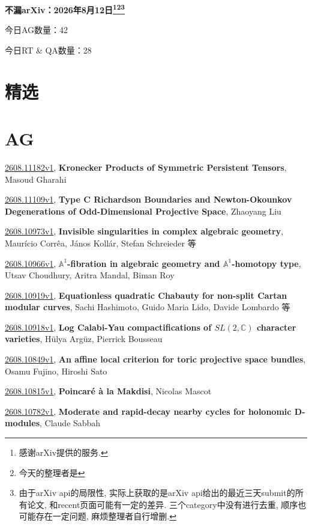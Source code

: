 \documentclass[9pt, a4paper]{article}
\theoremstyle{plain}
\theoremstyle{definition}
\theoremstyle{remark}
\newcommand{\arxiv}[3]{\href{https://arxiv.org/abs/#1}{#1}, \textbf{\textcolor{arxivblue}{#2}}, #3}
\newcommand{\AGnumber}{42}
\newcommand{\RTQAnumber}{28}
\newcommand{\NewestDate}{2026年8月12日}
\newcommand{\todayarXiver}{} %
\begin{document}
\begin{center}
    \Huge\textbf{不漏arXiv：\NewestDate\footnote{感谢arXiv提供的服务.}\footnote{今天的整理者是\todayarXiver}\footnote{由于arXiv api的局限性, 实际上获取的是arXiv api给出的最近三天submit的所有论文, 和recent页面可能有一定的差异. 三个category中没有进行去重, 顺序也可能存在一定问题, 麻烦整理者自行增删.}} \\
\end{center}

\setcounter{section}{-1}

\begin{center}
    今日AG数量：\AGnumber
    
    今日RT \& QA数量：\RTQAnumber
    
\end{center}


\section{精选}


\section{AG}
\arxiv{2608.11182v1}{Kronecker Products of Symmetric Persistent Tensors}{Masoud Gharahi}

\arxiv{2608.11109v1}{Type C Richardson Boundaries and Newton-Okounkov Degenerations of Odd-Dimensional Projective Space}{Zhaoyang Liu}

\arxiv{2608.10973v1}{Invisible singularities in complex algebraic geometry}{Maurício Corrêa, János Kollár, Stefan Schreieder 等}

\arxiv{2608.10966v1}{$\mathbb{A}^1$-fibration in algebraic geometry and $\mathbb{A}^1$-homotopy type}{Utsav Choudhury, Aritra Mandal, Biman Roy}

\arxiv{2608.10919v1}{Equationless quadratic Chabauty for non-split Cartan modular curves}{Sachi Hashimoto, Guido Maria Lido, Davide Lombardo 等}

\arxiv{2608.10918v1}{Log Calabi-Yau compactifications of $SL(2,\mathbb{C})$ character varieties}{Hülya Argüz, Pierrick Bousseau}

\arxiv{2608.10849v1}{An affine local criterion for toric projective space bundles}{Osamu Fujino, Hiroshi Sato}

\arxiv{2608.10815v1}{Poincaré à la Makdisi}{Nicolas Mascot}

\arxiv{2608.10782v1}{Moderate and rapid-decay nearby cycles for holonomic D-modules}{Claude Sabbah}
\end{document}
